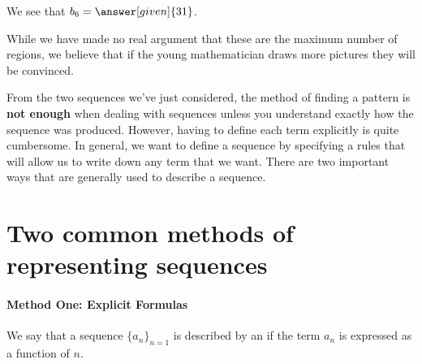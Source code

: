 \documentclass{ximera}
\begin{document}
\begin{example}
\begin{explanation}
\begin{itemize}
 We see that $b_6 = \answer[given]{31}$.
    \end{itemize}
    While we have made no real argument that these are the maximum
    number of regions, we believe that if the young mathematician draws
    more pictures they will be convinced.
  \end{explanation}
\end{example}


From the two sequences we've just considered, the method of finding
a pattern is \textbf{not enough} when dealing with sequences unless
you understand exactly how the sequence was produced.  However, having
to define each term explicitly is quite cumbersome.  In general, we
want to define a sequence by specifying a rules that will allow us to
write down any term that we want.  There are two important ways that
are generally used to describe a sequence.


\section{Two common methods of representing sequences}

\paragraph{Method One: Explicit Formulas}

\begin{definition}
We say that a sequence $\{a_n\}_{n=1}$ is described by an  if the term $a_n$ is expressed as a function of $n$.
\end{definition}
\end{document}
